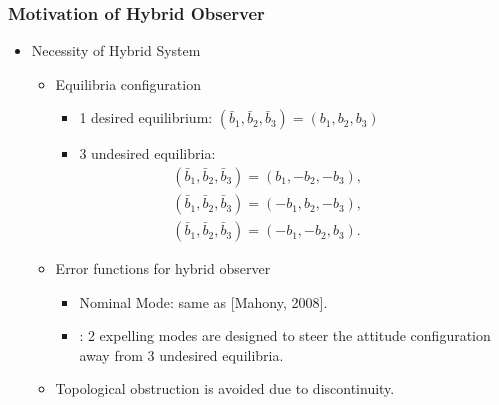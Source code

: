 \begin{frame} %
\frametitle{Motivation of Hybrid Observer}
\begin{itemize}
\item Necessity of Hybrid System
\begin{itemize} 
\item Equilibria configuration
	\begin{itemize} 
	\item 1 desired equilibrium: $(\bar{b}_1,\bar{b}_2,\bar{b}_3)=(b_1,b_2,b_3)$
	\item 3 undesired equilibria:
	{\small\begin{gather*} 
	(\bar{b}_1,\bar{b}_2,\bar{b}_3)=(b_1,-b_2,-b_3),\qquad\qquad\\
	(\bar{b}_1,\bar{b}_2,\bar{b}_3)=(-b_1,b_2,-b_3),\qquad\qquad\\
	(\bar{b}_1,\bar{b}_2,\bar{b}_3)=(-b_1,-b_2,b_3).\qquad\qquad
	\end{gather*}}
	\end{itemize} 
\vspace*{0.1cm} 
\pause
\item Error functions for hybrid observer
	\begin{itemize} 
	\item Nominal Mode: same as [Mahony, 2008].
	\vspace*{0.05cm} 
	\item {}: 2 expelling modes are designed to steer the attitude configuration away from 3 undesired equilibria.	 
	\end{itemize}
\vspace*{0.2cm} 	
\item Topological obstruction is avoided due to discontinuity.	
\end{itemize} 
\end{itemize} 
\end{frame}   %

